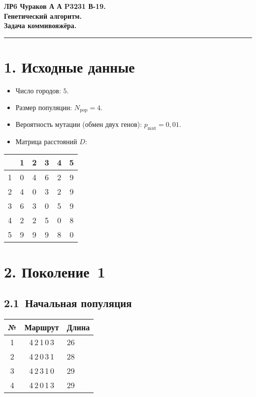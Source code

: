 \documentclass[a4paper,12pt]{article}
\begin{document}
\begin{center}
  \Large\bfseries
  ЛР6 Чураков А А P3231 В-19.\\
  Генетический алгоритм.\\
  Задача коммивояжёра.
\end{center}

\vspace{0.5em}\hrule\vspace{1em}

\section*{1. Исходные данные}

\begin{itemize}
  \item Число городов: $5$.
  \item Размер популяции: $N_{\text{pop}} = 4$.
  \item Вероятность мутации (обмен двух генов): $p_{\text{mut}} = 0{,}01$.
  \item Матрица расстояний $D$:\\[0.3em]
\end{itemize}

\begin{center}
\begin{tabular}{c|ccccc}
\toprule
&1&2&3&4&5\\\midrule
1&0&4&6&2&9\\
2&4&0&3&2&9\\
3&6&3&0&5&9\\
4&2&2&5&0&8\\
5&9&9&9&8&0\\
\bottomrule
\end{tabular}
\end{center}

\section*{2. Поколение 1}

\subsection*{2.1 Начальная популяция}

\begin{center}
\begin{tabular}{ccl}
\toprule
№ & Маршрут & Длина\\\midrule
1 & 4\,2\,1\,0\,3 & 26\\
2 & 4\,2\,0\,3\,1 & 28\\
3 & 4\,2\,3\,1\,0 & 29\\
4 & 4\,2\,0\,1\,3 & 29\\
\bottomrule
\end{tabular}
\end{center}
\end{document}
